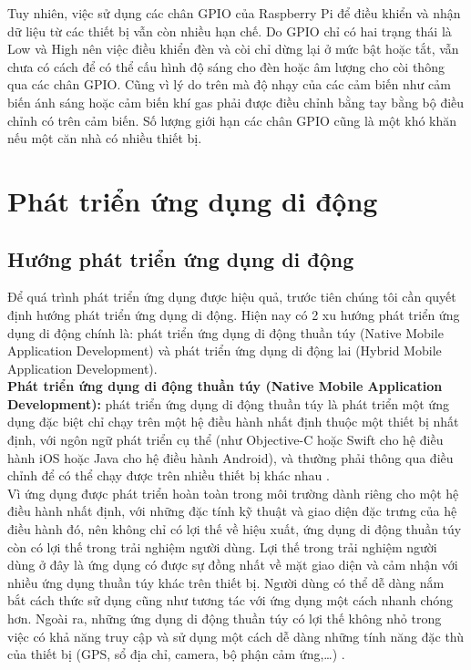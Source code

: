 \documentclass[12pt,a4paper,oneside]{extbook}
\begin{document}
\noindent
Tuy nhiên, việc sử dụng các chân GPIO của Raspberry Pi để điều khiển và nhận dữ liệu từ các thiết bị vẫn còn nhiều hạn chế. Do GPIO chỉ có hai trạng thái là Low và High nên việc điều khiển đèn và còi chỉ dừng lại ở mức bật hoặc tắt, vẫn chưa có cách để có thể cấu hình độ sáng cho đèn hoặc âm lượng cho còi thông qua các chân GPIO. Cũng vì lý do trên mà độ nhạy của các cảm biến như cảm biến ánh sáng hoặc cảm biến khí gas phải được điều chỉnh bằng tay bằng bộ điều chỉnh có trên cảm biến. Số lượng giới hạn các chân GPIO cũng là một khó khăn nếu một căn nhà có nhiều thiết bị.

\section{Phát triển ứng dụng di động}
\subsection{Hướng phát triển ứng dụng di động}
Để quá trình phát triển ứng dụng được hiệu quả, trước tiên chúng tôi cần quyết định hướng phát triển ứng dụng di động. Hiện nay có 2 xu hướng phát triển ứng dụng di động chính là: phát triển ứng dụng di động thuần túy (Native Mobile Application Development) và phát triển ứng dụng di động lai (Hybrid Mobile Application Development).\\

\noindent
\textbf{Phát triển ứng dụng di động thuần túy (Native Mobile Application Development):} phát triển ứng dụng di động thuần túy là phát triển một ứng dụng đặc biệt chỉ chạy trên một hệ điều hành nhất định thuộc một thiết bị nhất định, với ngôn ngữ phát triển cụ thể (như Objective-C hoặc Swift cho hệ điều hành iOS hoặc Java cho hệ điều hành Android), và thường phải thông qua điều chỉnh để có thể chạy được trên nhiều thiết bị khác nhau \cite{hybrid-vs-native-vn}.\\

\noindent
Vì ứng dụng được phát triển hoàn toàn trong môi trường dành riêng cho một hệ điều hành nhất định, với những đặc tính kỹ thuật và giao diện đặc trưng của hệ điều hành đó, nên không chỉ có lợi thế về hiệu xuất, ứng dụng di động thuần túy còn có lợi thế trong trải nghiệm người dùng. Lợi thế trong trải nghiệm người dùng ở đây là ứng dụng có được sự đồng nhất về mặt giao diện và cảm nhận với nhiều ứng dụng thuần túy khác trên thiết bị. Người dùng có thể dễ dàng nắm bắt cách thức sử dụng cũng như tương tác với ứng dụng một cách nhanh chóng hơn. Ngoài ra, những ứng dụng di động thuần túy có lợi thế không nhỏ trong việc có khả năng truy cập và sử dụng một cách dễ dàng những tính năng đặc thù của thiết bị (GPS, sổ địa chỉ, camera, bộ phận cảm ứng,\dots) \cite{hybrid-vs-native}.\\
\end{document}
